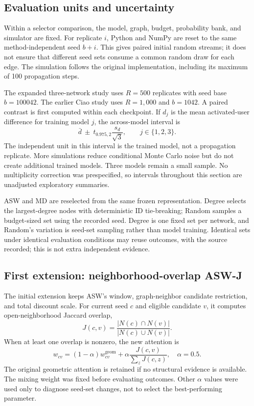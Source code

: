 \subsection{Evaluation units and uncertainty}
Within a selector comparison, the model, graph, budget, probability bank, and simulator are fixed. For replicate $i$, Python and NumPy are reset to the same method-independent seed $b+i$. This gives paired initial random streams; it does not ensure that different seed sets consume a common random draw for each edge. The simulation follows the original implementation, including its maximum of 100 propagation steps.

The expanded three-network study uses $R=500$ replicates with seed base $b=100042$. The earlier Ciao study uses $R=1,000$ and $b=1042$. A paired contrast is first computed within each checkpoint. If $d_j$ is the mean activated-user difference for training model $j$, the across-model interval is
\begin{equation}
\bar d\ \pm\ t_{0.975,2}\frac{s_d}{\sqrt{3}},
\qquad j\in\{1,2,3\}.
\end{equation}
The independent unit in this interval is the trained model, not a propagation replicate. More simulations reduce conditional Monte Carlo noise but do not create additional trained models. Three models remain a small sample. No multiplicity correction was prespecified, so intervals throughout this section are unadjusted exploratory summaries.

ASW and MD are reselected from the same frozen representation. Degree selects the largest-degree nodes with deterministic ID tie-breaking; Random samples a budget-sized set using the recorded seed. Degree is one fixed set per network, and Random's variation is seed-set sampling rather than model training. Identical sets under identical evaluation conditions may reuse outcomes, with the source recorded; this is not extra independent evidence.

\subsection{First extension: neighborhood-overlap ASW-J}
The initial extension keeps ASW's window, graph-neighbor candidate restriction, and total discount scale. For current seed $c$ and eligible candidate $v$, it computes open-neighborhood Jaccard overlap,
\begin{equation}
J(c,v)=\frac{|N(c)\cap N(v)|}{|N(c)\cup N(v)|}.
\end{equation}
When at least one overlap is nonzero, the new attention is
\begin{equation}
w_{cv}=(1-\alpha)w^{\mathrm{geom}}_{cv}
+\alpha\frac{J(c,v)}{\sum_{z}J(c,z)},\quad \alpha=0.5.
\end{equation}
The original geometric attention is retained if no structural evidence is available. The mixing weight was fixed before evaluating outcomes. Other $\alpha$ values were used only to diagnose seed-set changes, not to select the best-performing parameter.

